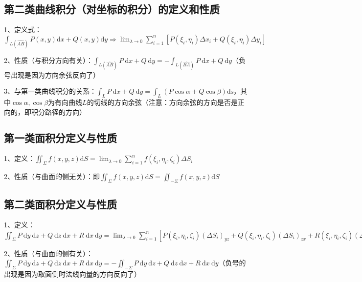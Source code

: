 \subsection{第二类曲线积分（对坐标的积分）的定义和性质}

1、定义式：$\int_{L(\widehat{A B})} P(x, y) \mathrm{d} x+Q(x, y) \mathrm{d} y \Longrightarrow \lim_{\lambda \rightarrow 0} \sum_{i=1}^{n}\left[P\left(\xi_{i}, \eta_{i}\right) \Delta x_{i}+Q\left(\xi_{i}, \eta_{i}\right) \Delta y_{i}\right]$

2、性质（与积分方向有关）：$\int_{L(\widehat{A B})} P \mathrm{~d} x+Q \mathrm{~d} y=-\int_{L(\widehat{B A})} P \mathrm{~d} x+Q \mathrm{~d} y$（负号出现是因为方向余弦反向了）

3、与第一类曲线积分的关系：$\int_{L} P \mathrm{~d} x+Q \mathrm{~d} y=\int_{L}(P \cos \alpha+Q \cos \beta) \mathrm{ds}$，其中$\cos \alpha, \cos \beta$为有向曲线$L$的切线的方向余弦（注意：方向余弦的方向是否是正向的，即积分路径的方向）



\subsection{第一类面积分定义与性质}

1、定义：$\iint_{\Sigma} f(x, y, z) \mathrm{d} S=\lim_{\lambda \rightarrow 0} \sum_{i=1}^{n} f\left(\xi_{i}, \eta_{i}, \zeta_{i}\right) \Delta S_{i}$

2、性质（与曲面的侧无关）：即$\iint_{\Sigma} f(x, y, z) \mathrm{d} S=\iint_{-\Sigma} f(x, y, z) \mathrm{d} S$



\subsection{第二类面积分定义与性质}

1、定义：$\iint_{\Sigma} P \mathrm{~d} y \mathrm{~d} z+Q \mathrm{~d} z \mathrm{~d} x+R \mathrm{~d} x \mathrm{~d} y=\lim _{\lambda \rightarrow 0} \sum_{i=1}^{n}[P\left(\xi_{i}, \eta_{i}, \zeta_{i}\right)\left(\Delta S_{i}\right)_{y z}+Q\left(\xi_{i}, \eta_{i}, \zeta_{i}\right)\left(\Delta S_{i}\right)_{z x}+R\left(\xi_{i}, \eta_{i}, \zeta_{i}\right)\left(\Delta S_{i}\right)_{x y}]$

2、性质（与曲面的侧有关）：$\iint_{\Sigma} P \mathrm{~d} y \mathrm{~d} z+Q \mathrm{~d} z \mathrm{~d} x+R \mathrm{~d} x \mathrm{~d} y=-\iint_{-\Sigma} P \mathrm{~d} y \mathrm{~d} z+Q \mathrm{~d} z \mathrm{~d} x+R \mathrm{~d} x \mathrm{~d} y$（负号的出现是因为取面侧时法线向量的方向反向了）


